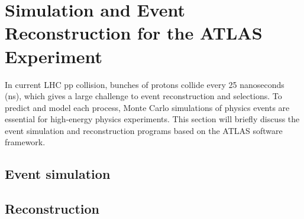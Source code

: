 \chapter{Simulation and Event Reconstruction for the ATLAS Experiment}

In current LHC pp collision, bunches of protons collide every 25 nanoseconds (ns), which gives a large challenge to event reconstruction and selections.
To predict and model each process, Monte Carlo simulations of physics events are essential for high-energy physics experiments.
This section will briefly discuss the event simulation and reconstruction programs based on the ATLAS software framework. 

\section{Event simulation}
\label{sec:simulation_framework}


\section{Reconstruction}
\label{sec:reconstruction}

